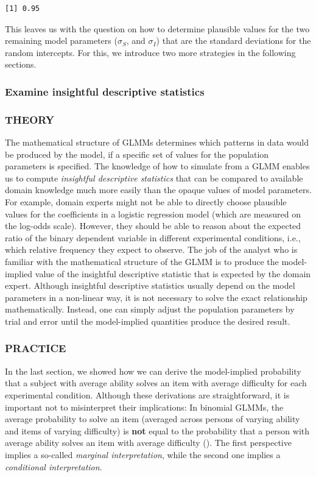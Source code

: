 \documentclass[
  man,
  floatsintext,
  longtable,
  a4paper,
  nolmodern,
  notxfonts,
  notimes,
  colorlinks=true,linkcolor=blue,citecolor=blue,urlcolor=blue]{apa7}
\begin{document}
\begin{verbatim}
[1] 0.95
\end{verbatim}

This leaves us with the question on how to determine plausible values
for the two remaining model parameters (\(\sigma_S\), and \(\sigma_I\))
that are the standard deviations for the random intercepts. For this, we
introduce two more strategies in the following sections.

\subsubsection{Examine insightful descriptive
statistics}\label{examine-insightful-descriptive-statistics}

\subsubsection{THEORY}\label{theory-3}

The mathematical structure of GLMMs determines which patterns in data
would be produced by the model, if a specific set of values for the
population parameters is specified. The knowledge of how to simulate
from a GLMM enables us to compute \emph{insightful descriptive
statistics} that can be compared to available domain knowledge much more
easily than the opaque values of model parameters. For example, domain
experts might not be able to directly choose plausible values for the
coefficients in a logistic regression model (which are measured on the
log-odds scale). However, they should be able to reason about the
expected ratio of the binary dependent variable in different
experimental conditions, i.e., which relative frequency they expect to
observe. The job of the analyst who is familiar with the mathematical
structure of the GLMM is to produce the model-implied value of the
insightful descriptive statistic that is expected by the domain expert.
Although insightful descriptive statistics usually depend on the model
parameters in a non-linear way, it is not necessary to solve the exact
relationship mathematically. Instead, one can simply adjust the
population parameters by trial and error until the model-implied
quantities produce the desired result.

\subsubsection{PRACTICE}\label{practice-3}

In the last section, we showed how we can derive the model-implied
probability that a subject with average ability solves an item with
average difficulty for each experimental condition. Although these
derivations are straightforward, it is important not to misinterpret
their implications: In binomial GLMMs, the average probability to solve
an item (averaged across persons of varying ability and items of varying
difficulty) is \textbf{not} equal to the probability that a person with
average ability solves an item with average difficulty
(). The first perspective implies a so-called \emph{marginal
interpretation}, while the second one implies a \emph{conditional
interpretation}.
\end{document}

